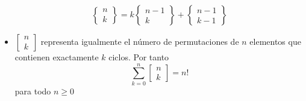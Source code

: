 \begin{itemize}
{		$$\left\{\begin{smallmatrix}
			n\\
			k
		\end{smallmatrix}\right\}
		= 
		k\left\{\begin{smallmatrix}
			n-1\\
			k
		\end{smallmatrix}\right\}
		+
		\left\{\begin{smallmatrix}
			n-1\\
			k-1
		\end{smallmatrix}\right\} 
		$$
    }
    \item{
        $\left[\begin{smallmatrix}
			n\\
			k
		\end{smallmatrix}\right]$
		representa igualmente el n\'umero de permutaciones de $n$ elementos que contienen exactamente
		$k$ ciclos. Por tanto
		$$
		\sum_{k=0}^n
		\left[\begin{smallmatrix}
			n\\
			k
		\end{smallmatrix}\right]
	    = n!	
		$$ para todo $n\geq0$ 
    }
    
\end{itemize}

